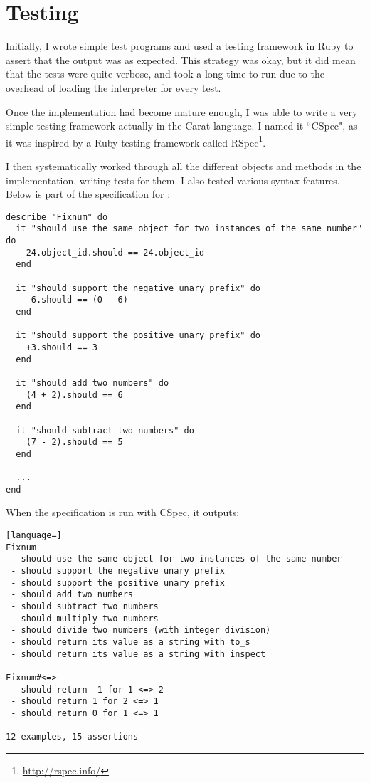 \section{Testing}

Initially, I wrote simple test programs and used a testing framework in Ruby to assert that the output was as expected. This strategy was okay, but it did mean that the tests were quite verbose, and took a long time to run due to the overhead of loading the interpreter for every test.

Once the implementation had become mature enough, I was able to write a very simple testing framework actually in the Carat language. I named it ``CSpec", as it was inspired by a Ruby testing framework called RSpec\footnote{\url{http://rspec.info/}}.

I then systematically worked through all the different objects and methods in the implementation, writing tests for them. I also tested various syntax features. Below is part of the specification for :

\begin{lstlisting}
describe "Fixnum" do
  it "should use the same object for two instances of the same number" do
    24.object_id.should == 24.object_id
  end
  
  it "should support the negative unary prefix" do
    -6.should == (0 - 6)
  end
  
  it "should support the positive unary prefix" do
    +3.should == 3
  end
  
  it "should add two numbers" do
    (4 + 2).should == 6
  end
  
  it "should subtract two numbers" do
    (7 - 2).should == 5
  end
  
  ...
end
\end{lstlisting}

\newpage
When the  specification is run with CSpec, it outputs:

\begin{minipage}{\textwidth}
\begin{lstlisting}[language=]
Fixnum
 - should use the same object for two instances of the same number
 - should support the negative unary prefix
 - should support the positive unary prefix
 - should add two numbers
 - should subtract two numbers
 - should multiply two numbers
 - should divide two numbers (with integer division)
 - should return its value as a string with to_s
 - should return its value as a string with inspect

Fixnum#<=>
 - should return -1 for 1 <=> 2
 - should return 1 for 2 <=> 1
 - should return 0 for 1 <=> 1

12 examples, 15 assertions
\end{lstlisting}
\end{minipage}

